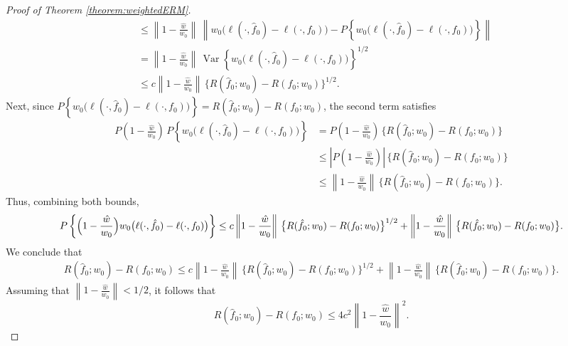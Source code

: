 \documentclass[11pt]{article}
\theoremstyle{plain}
\theoremstyle{definition} %
\newcommand{\Var}{\operatorname{Var}}
\begin{document}
\begin{proof}[Proof of Theorem \ref{theorem:weightedERM}]
\begin{align*}
&\le \left\|1-\frac{\hat w}{w_0}\right\|\,
\left\|w_0\bigl(\ell(\cdot,\hat f_0)-\ell(\cdot,f_0)\bigr)
- P\left\{w_0\bigl(\ell(\cdot,\hat f_0)-\ell(\cdot,f_0)\bigr)\right\}\right\|\\
&= \left\|1-\frac{\hat w}{w_0}\right\|\,
\Var\left\{w_0\bigl(\ell(\cdot,\hat f_0)-\ell(\cdot,f_0)\bigr)\right\}^{1/2}\\
&\le c\left\|1-\frac{\hat w}{w_0}\right\|\,\bigl\{R(\hat f_0;w_0)-R(f_0;w_0)\bigr\}^{1/2}.
\end{align*}
Next, since $P\left\{w_0\bigl(\ell(\cdot,\hat f_0)-\ell(\cdot,f_0)\bigr)\right\}
=
R(\hat f_0;w_0)-R(f_0;w_0)$, the second term satisfies
\begin{align*}
P\left(1-\frac{\hat w}{w_0}\right)\,
P\left\{w_0\bigl(\ell(\cdot,\hat f_0)-\ell(\cdot,f_0)\bigr)\right\}
&=
P\left(1-\frac{\hat w}{w_0}\right)\,
\bigl\{R(\hat f_0;w_0)-R(f_0;w_0)\bigr\}\\
&\le
\left|P\left(1-\frac{\hat w}{w_0}\right)\right|\,
\bigl\{R(\hat f_0;w_0)-R(f_0;w_0)\bigr\}\\
&\le
\left\|1-\frac{\hat w}{w_0}\right\|\,
\bigl\{R(\hat f_0;w_0)-R(f_0;w_0)\bigr\}.
\end{align*}
Thus, combining both bounds,
\[
P\left\{\Bigl(1-\frac{\hat w}{w_0}\Bigr) w_0\bigl(\ell(\cdot,\hat f_0)-\ell(\cdot,f_0)\bigr)\right\}
\le
c\left\|1-\frac{\hat w}{w_0}\right\|\,\bigl\{R(\hat f_0;w_0)-R(f_0;w_0)\bigr\}^{1/2}
+
\left\|1-\frac{\hat w}{w_0}\right\|\,
\bigl\{R(\hat f_0;w_0)-R(f_0;w_0)\bigr\}.
\]
We conclude that
\begin{align*}
R(\hat f_0;w_0)-R(f_0;w_0) \le
c\left\|1-\frac{\hat w}{w_0}\right\|\,\bigl\{R(\hat f_0;w_0)-R(f_0;w_0)\bigr\}^{1/2}
+
\left\|1-\frac{\hat w}{w_0}\right\|\,
\bigl\{R(\hat f_0;w_0)-R(f_0;w_0)\bigr\}.
\end{align*}
Assuming that $\left\|1-\frac{\hat w}{w_0}\right\| < 1/2$, it follows that
\[
R(\hat f_0;w_0)-R(f_0;w_0)\le 4c^2\left\|1-\frac{\hat w}{w_0}\right\|^2.
\]



\end{proof}
\end{document}
